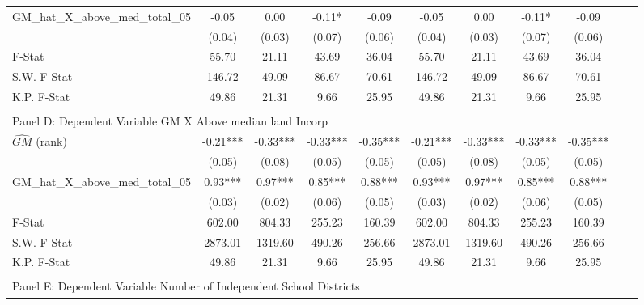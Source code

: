 \begin{table}[htbp]
\begin{threeparttable}
\begin{tabular}{l*{10}{c}}
\addlinespace
GM\_hat\_X\_above\_med\_total\_05&      -0.05   &       0.00   &      -0.11*  &      -0.09   &      -0.05   &       0.00   &      -0.11*  &      -0.09   \\
                &     (0.04)   &     (0.03)   &     (0.07)   &     (0.06)   &     (0.04)   &     (0.03)   &     (0.07)   &     (0.06)   \\
\midrule
F-Stat          &      55.70   &      21.11   &      43.69   &      36.04   &      55.70   &      21.11   &      43.69   &      36.04   \\
S.W. F-Stat     &     146.72   &      49.09   &      86.67   &      70.61   &     146.72   &      49.09   &      86.67   &      70.61   \\
K.P. F-Stat     &      49.86   &      21.31   &       9.66   &      25.95   &      49.86   &      21.31   &       9.66   &      25.95   \\
\cmidrule[\heavyrulewidth](lr){1-9} \\ \cmidrule[\heavyrulewidth](lr){1-9}
\multicolumn{8}{l}{Panel D: Dependent Variable GM X Above median land Incorp}\\
\cmidrule(lr){1-9}
$\hat{GM}$ (rank)&      -0.21***&      -0.33***&      -0.33***&      -0.35***&      -0.21***&      -0.33***&      -0.33***&      -0.35***\\
                &     (0.05)   &     (0.08)   &     (0.05)   &     (0.05)   &     (0.05)   &     (0.08)   &     (0.05)   &     (0.05)   \\
\addlinespace
GM\_hat\_X\_above\_med\_total\_05&       0.93***&       0.97***&       0.85***&       0.88***&       0.93***&       0.97***&       0.85***&       0.88***\\
                &     (0.03)   &     (0.02)   &     (0.06)   &     (0.05)   &     (0.03)   &     (0.02)   &     (0.06)   &     (0.05)   \\
\midrule
F-Stat          &     602.00   &     804.33   &     255.23   &     160.39   &     602.00   &     804.33   &     255.23   &     160.39   \\
S.W. F-Stat     &    2873.01   &    1319.60   &     490.26   &     256.66   &    2873.01   &    1319.60   &     490.26   &     256.66   \\
K.P. F-Stat     &      49.86   &      21.31   &       9.66   &      25.95   &      49.86   &      21.31   &       9.66   &      25.95   \\
\cmidrule[\heavyrulewidth](lr){1-9} \\ \cmidrule[\heavyrulewidth](lr){1-9}
\multicolumn{8}{l}{Panel E: Dependent Variable Number of Independent School Districts}\\

\end{tabular}
\end{threeparttable}
\end{table}
